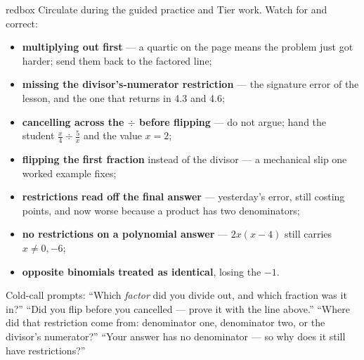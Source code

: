 \documentclass[10pt]{article}
\begin{document}
\begin{skillbox}{redbox}
Circulate during the guided practice and Tier work. Watch for and correct:
\begin{itemize}[leftmargin=1.2em, nosep]
  \item \textbf{multiplying out first} --- a quartic on the page means the problem just got harder; send them back to the factored line;
  \item \textbf{missing the divisor's-numerator restriction} --- the signature error of the lesson, and the one that returns in 4.3 and 4.6;
  \item \textbf{cancelling across the $\div$ before flipping} --- do not argue; hand the student $\frac x4\div\frac5x$ and the value $x=2$;
  \item \textbf{flipping the first fraction} instead of the divisor --- a mechanical slip one worked example fixes;
  \item \textbf{restrictions read off the final answer} --- yesterday's error, still costing points, and now worse because a product has two denominators;
  \item \textbf{no restrictions on a polynomial answer} --- $2x(x-4)$ still carries $x\neq0,-6$;
  \item \textbf{opposite binomials treated as identical}, losing the $-1$.
\end{itemize}
Cold-call prompts: ``Which \emph{factor} did you divide out, and which fraction was it in?'' ``Did you
flip before you cancelled --- prove it with the line above.'' ``Where did that restriction come from:
denominator one, denominator two, or the divisor's numerator?'' ``Your answer has no denominator ---
so why does it still have restrictions?''
\end{skillbox}
\end{document}
